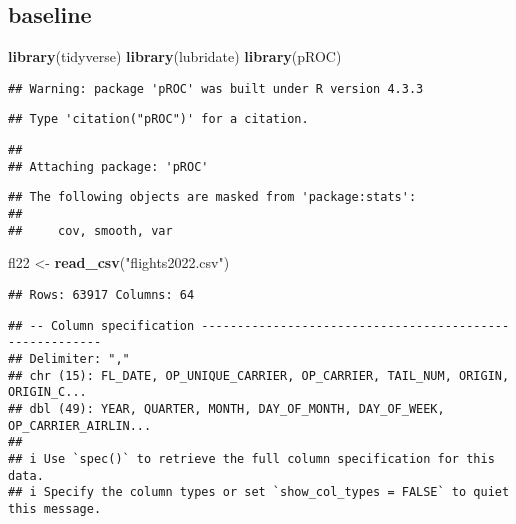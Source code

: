 \documentclass[
]{article}
\newenvironment{Shaded}{\begin{snugshade}}{\end{snugshade}}
\newcommand{\FunctionTok}[1]{\textcolor[rgb]{0.13,0.29,0.53}{\textbf{#1}}}
\newcommand{\NormalTok}[1]{#1}
\newcommand{\OtherTok}[1]{\textcolor[rgb]{0.56,0.35,0.01}{#1}}
\newcommand{\StringTok}[1]{\textcolor[rgb]{0.31,0.60,0.02}{#1}}
\begin{document}
\subsection{baseline}\label{baseline}

\begin{Shaded}
\begin{Highlighting}[]
\FunctionTok{library}\NormalTok{(tidyverse)}
\FunctionTok{library}\NormalTok{(lubridate)}
\FunctionTok{library}\NormalTok{(pROC)}
\end{Highlighting}
\end{Shaded}

\begin{verbatim}
## Warning: package 'pROC' was built under R version 4.3.3
\end{verbatim}

\begin{verbatim}
## Type 'citation("pROC")' for a citation.
\end{verbatim}

\begin{verbatim}
## 
## Attaching package: 'pROC'
\end{verbatim}

\begin{verbatim}
## The following objects are masked from 'package:stats':
## 
##     cov, smooth, var
\end{verbatim}

\begin{Shaded}
\begin{Highlighting}[]
\NormalTok{fl22 }\OtherTok{\textless{}{-}} \FunctionTok{read\_csv}\NormalTok{(}\StringTok{"flights2022.csv"}\NormalTok{)}
\end{Highlighting}
\end{Shaded}

\begin{verbatim}
## Rows: 63917 Columns: 64
\end{verbatim}

\begin{verbatim}
## -- Column specification --------------------------------------------------------
## Delimiter: ","
## chr (15): FL_DATE, OP_UNIQUE_CARRIER, OP_CARRIER, TAIL_NUM, ORIGIN, ORIGIN_C...
## dbl (49): YEAR, QUARTER, MONTH, DAY_OF_MONTH, DAY_OF_WEEK, OP_CARRIER_AIRLIN...
## 
## i Use `spec()` to retrieve the full column specification for this data.
## i Specify the column types or set `show_col_types = FALSE` to quiet this message.
\end{verbatim}
\end{document}
